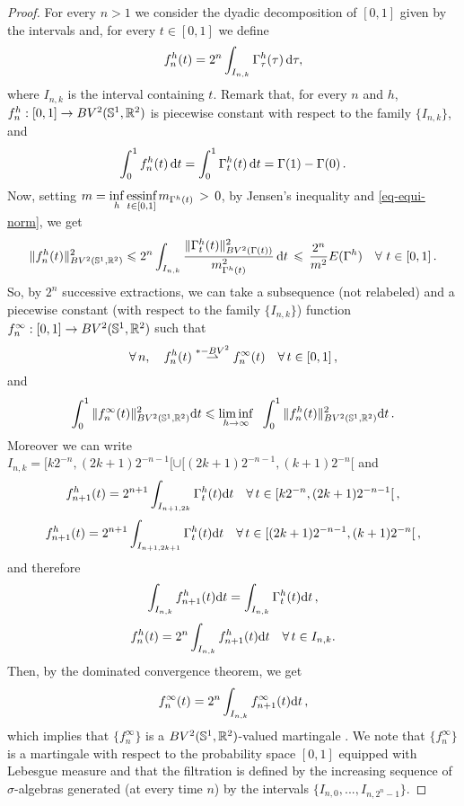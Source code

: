 \begin{proof}
\medskip
{} For every $n>1$ we consider the dyadic decomposition of $[0,1]$ given by the intervals  
\eql{\label{eq-dyadic}
	I_{n,k} = [\frac{k}{2^n},\frac{k+1}{2^n}[
	\qforq k \in [0,2^n-1]
}
and, for every $t\in [0,1]$  we define 
$$f_{n}^h(t)=2^n \int_{I_{n,k}} \Gamma^h_\tau(\tau)\, \mathrm{d} \tau, $$
where $I_{n,k}$ is the interval containing $t$. Remark that, for every $n$ and $h$, $f_{n}^h: [0,1]\rightarrow BV^2(\mathbb{S}^1,\mathbb{R}^2)$  is  piecewise constant with respect to the family $\{I_{n,k}\}$, and
\begin{equation}\label{dom-conv}
\int_0^1 f_n^h(t)\, \mathrm{d} t = \int_0^1 \Gamma^h_t(t)\, \mathrm{d} t = \Gamma(1)-\Gamma(0)\,.
\end{equation}  
Now, setting
$m = \underset{h}{\inf}\,\underset{t\in [0,1]}{\mbox{essinf}}\, m_{\Gamma^h(t)}\, >\,0
$, by Jensen's inequality and \eqref{eq-equi-norm}, we get 
\begin{equation}\label{bound0}
\|f^h_n(t)\|^2_{BV^2(\mathbb{S}^1,\mathbb{R}^2)}\leqslant 2^n\int_{I_{n,k}} \frac{\|\Gamma_t^h(t)\|^2_{BV^2(\Gamma(t))}}{m_{\Gamma^h(t)}^2}\,\mathrm{d} t \,\leqslant \, \frac{2^n}{m^2}E(\Gamma^h)\quad \forall \, \, t\in [0,1]\,.
 \end{equation}
So, by $2^n$ successive extractions, we can take
a subsequence (not relabeled) and  a  piecewise constant (with respect to the family $\{I_{n,k}\}$) function $f_{n}^\infty: [0,1]\rightarrow BV^2(\mathbb{S}^1,\mathbb{R}^2)$  such that 
$$\forall \, n, \quad f^h_n(t) \overset{*-BV^2}{\rightharpoonup} f^\infty_n(t) \quad \forall \, t\in [0,1]\,,$$
and
\begin{equation}\label{conv} \int_0^1\|f_n^\infty(t)\|^2_{BV^2(\mathbb{S}^1,\mathbb{R}^2)} \mathrm{d} t \leqslant \underset{h\rightarrow \infty}{\liminf} \;\; \int_0^1\|f^h_n(t)\|^2_{BV^2(\mathbb{S}^1,\mathbb{R}^2)}\mathrm{d} t\,.
\end{equation}
Moreover we can write 
$I_{n,k}=[k2^{-n}, (2k+1)2^{-n-1}[\cup [(2k+1)2^{-n-1}, (k+1)2^{-n}[$
and 
$$f^h_{n+1}(t) = 2^{n+1}\int_{I_{n+1,2k}} \Gamma^h_t(t) \mathrm{d} t \quad \forall \, t\in [k2^{-n}, (2k+1)2^{-n-1}[\,,$$
$$f^h_{n+1}(t) = 2^{n+1}\int_{I_{n+1,2k+1}}\Gamma^h_t(t) \mathrm{d} t  \quad \forall \, t\in [(2k+1)2^{-n-1}, (k+1)2^{-n}[\,,$$
and therefore
$$\int_{I_{n,k}}f^h_{n+1}(t) \mathrm{d} t =  \int_{I_{n,k}}\Gamma^h_t(t) \mathrm{d} t\,,$$
$$f^h_n(t) = 2^n \int_{I_{n,k}}f^h_{n+1}(t)\mathrm{d} t \quad \forall \, t\in I_{n,k}.$$
Then, by the dominated convergence theorem, we get
\begin{equation}\label{marti}
 f_n^\infty(t) = 2^n \int_{I_{n,k}}f_{n+1}^\infty(t) \mathrm{d} t\,,
\end{equation}
which implies that $\{f^\infty_n\}$ is a $BV^2(\mathbb{S}^1,\mathbb{R}^2)$-valued martingale \cite{Durett, Chatterji}. We note that $\{f^\infty_n\}$ is a martingale with respect to the probability space $[0,1]$ equipped with Lebesgue measure and that the filtration is defined by the increasing sequence of $\sigma$-algebras generated (at every time $n$) by the intervals $\{I_{n,0},...,I_{n,2^n-1}\}$.


\end{proof}
